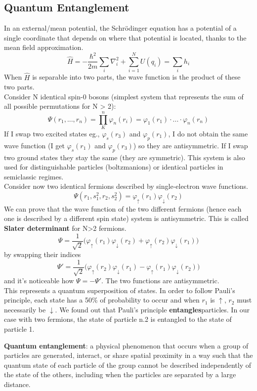 \subsection{Quantum Entanglement}
In an external/mean potential, the Schr\"odinger equation has a potential of a single coordinate that depends on where that potential is located, thanks to the mean field approximation.
\[
\hat{H}=-\frac{\hbar^2}{2m}\sum_{i}\nabla_i^2+\sum_{i=1}^NU(q_i)=\sum_i h_i
\]
When $\hat{H}$ is separable into two parts, the wave function is the product of these two parts.\\
Consider N identical spin-0 bosons (simplest system that represents the sum of all possible permutations for N > 2):\\
\[
\Psi(r_1, ..., r_n)= \prod_K^n\varphi_n(r_i)=\varphi_1(r_1)\cdot ... \cdot \varphi_n(r_n)
\]
If I swap two excited states eg., $\varphi_s(r_3)$ and $\varphi_p(r_1)$, I do not obtain the same wave function (I get $\varphi_s(r_1)$ and $\varphi_p(r_3)$) so they are antisymmetric. If I swap two ground states they stay the same (they are symmetric). This system is also used for distinguishable particles (boltzmanions) or identical particles in semiclassic regimes.\\
\newline
Consider now two identical fermions described by single-electron wave functions.\\
\[
\Psi(r_1, s_1^2, r_2, s_2^2)=\varphi_{\uparrow}(r_1)\varphi_{\downarrow}(r_2)
\]
We can prove that the wave function of the two different fermions (hence each one is described by a different spin state) system is antisymmetric. This is called \textbf{Slater determinant} for N>2 fermions.
\[
\Psi=\frac{1}{\sqrt{2}}\big(\varphi_{\uparrow}(r_1)\varphi_{\downarrow}(r_2)+\varphi_{\uparrow}(r_2)\varphi_{\downarrow}(r_1)\big)
\]
by swapping their indices
\[
\Psi'=\frac{1}{\sqrt{2}}\big(\varphi_{\uparrow}(r_2)\varphi_{\downarrow}(r_1)-\varphi_{\uparrow}(r_1)\varphi_{\downarrow}(r_2)\big)
\]
and it's noticeable how $\Psi = -\Psi'$. The two functions are antisymmetric.\\
This represents a quantum superposition of states. In order to follow Pauli's principle, each state has a 50\% of probability to occur and when $r_1$ is $\uparrow$,  $r_2$ must necessarily be $\downarrow$. We found out that Pauli's principle \textbf{entangles}particles. In our case with two fermions, the state of particle n.2 is entangled to the state of particle 1.

\begin{center}
\textbf{Quantum entanglement}: a physical phenomenon that occurs when a group of particles are generated, interact, or share spatial proximity in a way such that the quantum state of each particle of the group cannot be described independently of the state of the others, including when the particles are separated by a large distance.
\end{center}

